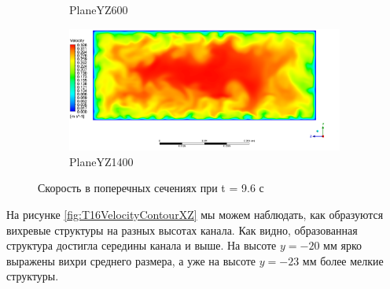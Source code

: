 \begin{figure}[H]
\begin{subfigure}{.5\textwidth}
			\caption{PlaneYZ600}
			\label{fig:T96VelocityContourYZ600}
		\end{subfigure}%
		\begin{subfigure}{.5\textwidth}
			\centering
			\includegraphics[width=1.1\linewidth]{../Assets/T96_Velocity_ContourYZ1400}
			\caption{PlaneYZ1400}
			\label{fig:T96VelocityContourYZ1400}
		\end{subfigure}
		\caption{Скорость в поперечных сечениях при t = 9.6 с}
		\label{fig:T96VelocityContourYZ}
	\end{figure}
	\newpage
	На рисунке \ref{fig:T16VelocityContourXZ} мы можем наблюдать, как образуются вихревые структуры на разных высотах канала. Как видно, образованная структура достигла середины канала и выше. На высоте $y = -20$ мм ярко выражены вихри среднего размера, а уже на высоте $y = -23$ мм более мелкие структуры.
